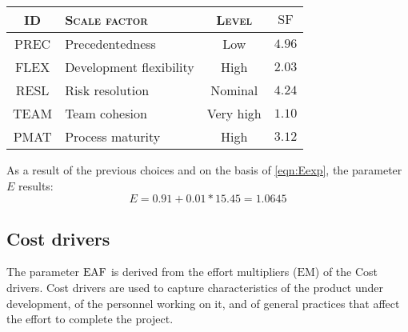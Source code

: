\begin{table}\begin{tabularx}{\textwidth}{ >{\ttfamily}c X c c }

\toprule
\normalfont\textsc{ID} & \normalfont\textsc{Scale factor} & \normalfont\textsc{Level} & $ \text{SF} $ \\
\toprule
PREC	& Precedentedness			& Low		& $ 4.96 $ \\ \midrule
FLEX	& Development flexibility	& High		& $ 2.03 $ \\ \midrule
RESL	& Risk resolution			& Nominal	& $ 4.24 $\\ \midrule
TEAM	& Team cohesion				& Very high	& $ 1.10 $\\ \midrule
PMAT	& Process maturity			& High		& $ 3.12 $\\ 

\bottomrule
	
\end{tabularx}
\end{table}



As a result of the previous choices and on the basis of \cref{eqn:Eexp}, the parameter $ E $ results:
\begin{equation}
	E = 0.91 + 0.01 * 15.45 = 1.0645
\end{equation}

















\subsection*{Cost drivers} The parameter $ \text{EAF} $ is derived from the effort multipliers ($ \text{EM} $) of the Cost drivers. Cost drivers are used to capture characteristics of the product under development, of the personnel working on it, and of general practices that affect the effort to complete the project.



